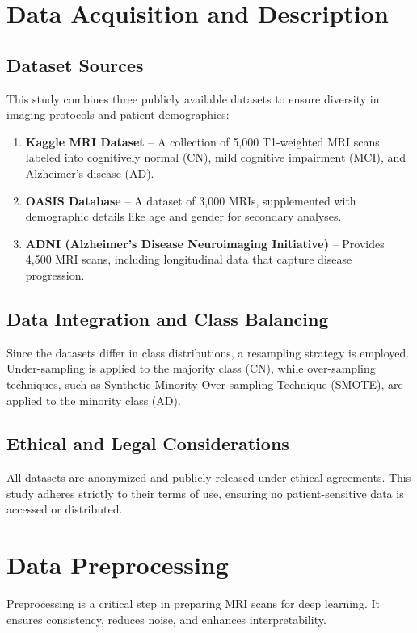 \documentclass[12pt,twocolumn]{report}
\begin{document}
\section{Data Acquisition and Description}

\subsection{Dataset Sources}
This study combines three publicly available datasets to ensure diversity in imaging protocols and patient demographics:
\begin{enumerate}
    \item \textbf{Kaggle MRI Dataset} – A collection of 5,000 T1-weighted MRI scans labeled into cognitively normal (CN), mild cognitive impairment (MCI), and Alzheimer’s disease (AD).
    \item \textbf{OASIS Database} – A dataset of 3,000 MRIs, supplemented with demographic details like age and gender for secondary analyses.
    \item \textbf{ADNI (Alzheimer’s Disease Neuroimaging Initiative)} – Provides 4,500 MRI scans, including longitudinal data that capture disease progression.
\end{enumerate}

\subsection{Data Integration and Class Balancing}
Since the datasets differ in class distributions, a resampling strategy is employed. Under-sampling is applied to the majority class (CN), while over-sampling techniques, such as Synthetic Minority Over-sampling Technique (SMOTE), are applied to the minority class (AD).

\subsection{Ethical and Legal Considerations}
All datasets are anonymized and publicly released under ethical agreements. This study adheres strictly to their terms of use, ensuring no patient-sensitive data is accessed or distributed.

\section{Data Preprocessing}

Preprocessing is a critical step in preparing MRI scans for deep learning. It ensures consistency, reduces noise, and enhances interpretability.
\end{document}
